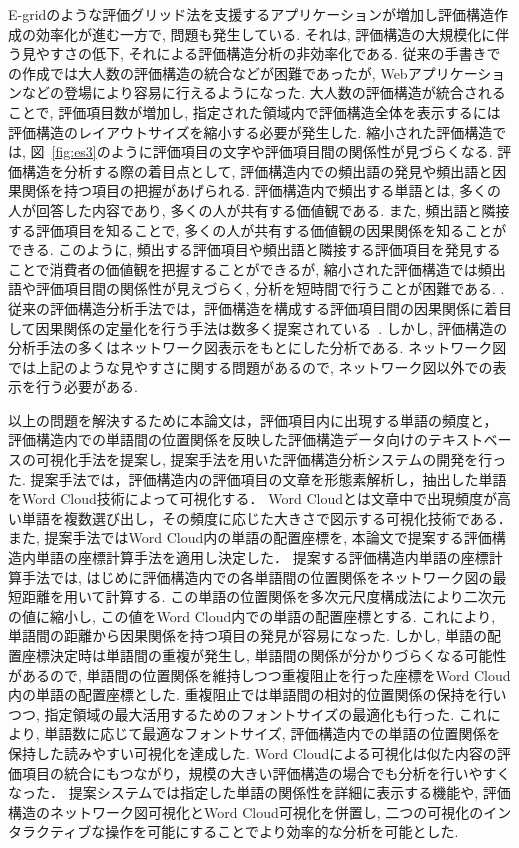 \documentclass[syuuron]{kuee}
\begin{document}
	E-gridのような評価グリッド法を支援するアプリケーションが増加し評価構造作成の効率化が進む一方で, 問題も発生している. 
	それは, 評価構造の大規模化に伴う見やすさの低下, それによる評価構造分析の非効率化である. 
	従来の手書きでの作成では大人数の評価構造の統合などが困難であったが, Webアプリケーションなどの登場により容易に行えるようになった. 
	大人数の評価構造が統合されることで, 評価項目数が増加し, 指定された領域内で評価構造全体を表示するには評価構造のレイアウトサイズを縮小する必要が発生した.  
	縮小された評価構造では, 図~\ref{fig:es3}のように評価項目の文字や評価項目間の関係性が見づらくなる. 
	評価構造を分析する際の着目点として, 評価構造内での頻出語の発見や頻出語と因果関係を持つ項目の把握があげられる. 
	評価構造内で頻出する単語とは, 多くの人が回答した内容であり, 多くの人が共有する価値観である. 
	また, 頻出語と隣接する評価項目を知ることで, 多くの人が共有する価値観の因果関係を知ることができる. 
	このように, 頻出する評価項目や頻出語と隣接する評価項目を発見することで消費者の価値観を把握することができるが, 
	縮小された評価構造では頻出語や評価項目間の関係性が見えづらく, 分析を短時間で行うことが困難である. 	. 
	従来の評価構造分析手法では，評価構造を構成する評価項目間の因果関係に着目して因果関係の定量化を行う手法は数多く提案されている~\cite{egm8, egm9}. 
	しかし, 評価構造の分析手法の多くはネットワーク図表示をもとにした分析である. 
	ネットワーク図では上記のような見やすさに関する問題があるので, ネットワーク図以外での表示を行う必要がある. 
	
	以上の問題を解決するために本論文は，評価項目内に出現する単語の頻度と，
	評価構造内での単語間の位置関係を反映した評価構造データ向けのテキストベースの可視化手法を提案し, 
	提案手法を用いた評価構造分析システムの開発を行った. 
	提案手法では，評価構造内の評価項目の文章を形態素解析し，抽出した単語をWord Cloud技術によって可視化する．
	Word Cloudとは文章中で出現頻度が高い単語を複数選び出し，その頻度に応じた大きさで図示する可視化技術である．
	また, 提案手法ではWord Cloud内の単語の配置座標を, 本論文で提案する評価構造内単語の座標計算手法を適用し決定した．
	提案する評価構造内単語の座標計算手法では, はじめに評価構造内での各単語間の位置関係をネットワーク図の最短距離を用いて計算する. 
	この単語の位置関係を多次元尺度構成法により二次元の値に縮小し, この値をWord Cloud内での単語の配置座標とする. 
	これにより, 単語間の距離から因果関係を持つ項目の発見が容易になった. 
	しかし, 単語の配置座標決定時は単語間の重複が発生し, 単語間の関係が分かりづらくなる可能性があるので, 
	単語間の位置関係を維持しつつ重複阻止を行った座標をWord Cloud内の単語の配置座標とした. 
	重複阻止では単語間の相対的位置関係の保持を行いつつ, 指定領域の最大活用するためのフォントサイズの最適化も行った. 
	これにより, 単語数に応じて最適なフォントサイズ, 評価構造内での単語の位置関係を保持した読みやすい可視化を達成した. 
	Word Cloudによる可視化は似た内容の評価項目の統合にもつながり，規模の大きい評価構造の場合でも分析を行いやすくなった．
	提案システムでは指定した単語の関係性を詳細に表示する機能や, 評価構造のネットワーク図可視化とWord Cloud可視化を併置し, 
	二つの可視化のインタラクティブな操作を可能にすることでより効率的な分析を可能とした. 
\end{document}
